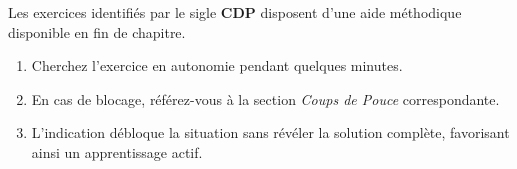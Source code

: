 \vspace{1.5em}

\begin{tcolorbox}[
  colback=encre!5,
  colframe=encre!50,
  arc=4pt,
  boxrule=0.6pt,
  left=10pt, right=10pt, top=8pt, bottom=8pt,
  title={\bfseries\sffamily Le Dispositif Coup de Pouce (CDP)}
]
\sffamily
Les exercices identifiés par le sigle \textbf{CDP} disposent d'une aide méthodique disponible en fin de chapitre.
\begin{enumerate}[leftmargin=1.5em, itemsep=2pt]
  \item Cherchez l'exercice en autonomie pendant quelques minutes.
  \item En cas de blocage, référez-vous à la section \textit{Coups de Pouce} correspondante.
  \item L'indication débloque la situation sans révéler la solution complète, favorisant ainsi un apprentissage actif.
\end{enumerate}
\end{tcolorbox}
